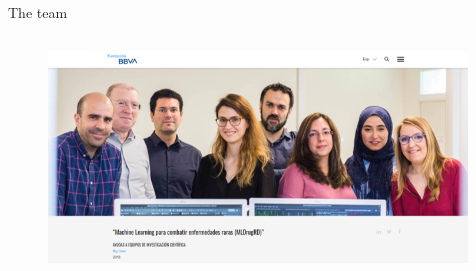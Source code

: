 \documentclass[compress,ignorenonframetext,aspectratio=1610]{beamer}
\begin{document}
	\begin{frame}{The team}

		\begin{columns}
			\begin{column}{0.6\textwidth}
				\begin{figure}
					\includegraphics[width=0.99\textwidth]{figs/people/funding_rd.png}	
				\end{figure}
			\end{column}


\end{columns}
\end{frame}
\end{document}
